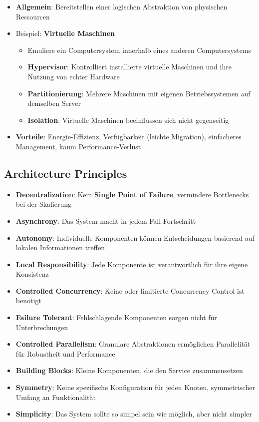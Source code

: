 \begin{itemize}
	\item \textbf{Allgemein}: Bereitstellen einer logischen Abstraktion von physischen Ressourcen
	\item Beispiel: \textbf{Virtuelle Maschinen}
	\begin{itemize}
		\item Emuliere ein Computersystem innerhalb eines anderen Computersystems
		\item \textbf{Hypervisor}: Kontrolliert installierte virtuelle Maschinen und ihre Nutzung von echter Hardware
		\item \textbf{Partitionierung}: Mehrere Maschinen mit eigenen Betriebssystemen auf demselben Server
		\item \textbf{Isolation}: Virtuelle Maschinen beeinflussen sich nicht gegenseitig
	\end{itemize}
	\item \textbf{Vorteile}: Energie-Effizienz, Verfügbarkeit (leichte Migration), einfacheres Management, kaum Performance-Verlust
\end{itemize}

\subsection{Architecture Principles}
\label{cla:sub:architecture_principles}

\begin{itemize}
	\item \textbf{Decentralization}: Kein \textbf{Single Point of Failure}, vermindere Bottlenecks bei der Skalierung
	\item \textbf{Asynchrony}: Das System macht in jedem Fall Fortschritt
	\item \textbf{Autonomy}: Individuelle Komponenten können Entscheidungen basierend auf lokalen Informationen treffen
	\item \textbf{Local Responsibility}: Jede Komponente ist verantwortlich für ihre eigene Konsistenz
	\item \textbf{Controlled Concurrency}: Keine oder limitierte Concurrency Control ist benötigt
	\item \textbf{Failure Tolerant}: Fehlschlagende Komponenten sorgen nicht für Unterbrechungen
	\item \textbf{Controlled Parallelism}: Granulare Abstraktionen ermöglichen Parallelität für Robustheit und Performance
	\item \textbf{Building Blocks}: Kleine Komponenten, die den Service zusammensetzen
	\item \textbf{Symmetry}: Keine spezifische Konfiguration für jeden Knoten, symmetrischer Umfang an Funktionalität
	\item \textbf{Simplicity}: Das System sollte so simpel sein wie möglich, aber nicht simpler
\end{itemize}